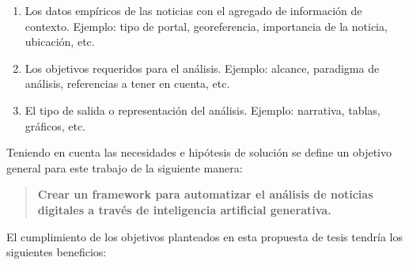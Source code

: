 \documentclass[12pt]{article}
\begin{document}
    \begin{enumerate}
        \item Los datos empíricos de las noticias con el agregado de información de contexto. Ejemplo:  tipo de portal, georeferencia, importancia de la noticia, ubicación, etc.
        \item Los objetivos requeridos para el análisis. Ejemplo: alcance, paradigma de análisis, referencias a tener en cuenta, etc.
        \item El tipo de salida o representación del análisis. Ejemplo: narrativa, tablas, gráficos, etc.
    \end{enumerate}



Teniendo en cuenta las necesidades e hipótesis de solución se define un objetivo general para este trabajo de la siguiente manera: 

\begin{quote}
        \textbf{Crear un framework para automatizar el análisis de noticias digitales a través de inteligencia artificial generativa.
        }
\end{quote}

El cumplimiento de los objetivos planteados en esta propuesta de tesis tendría los siguientes beneficios:
\end{document}
